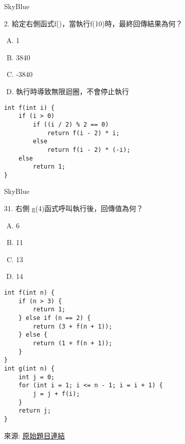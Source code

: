\documentclass{article}
\begin{document}
\renewcommand{\baselinestretch}{1.5}


\begin{sblock}{SkyBlue}

2. 給定右側函式f()，當執行f(10)時，最終回傳結果為何？\\

\begin{enumerate}[(A)]
    \item 1
    \item 3840
    \item -3840
    \item 執行時導致無限迴圈，不會停止執行
\end{enumerate}

\tcblower
\begin{verbatim}
int f(int i) {
	if (i > 0)
		if ((i / 2) % 2 == 0)
			return f(i - 2) * i;
		else
			return f(i - 2) * (-i);
	else
		return 1;
}
\end{verbatim}
\end{sblock}

\begin{sblock}{SkyBlue}

31. 右側 g(4)函式呼叫執行後，回傳值為何？\\

\begin{enumerate}[(A)]
    \item 6
    \item 11
    \item 13
    \item 14
\end{enumerate}

\tcblower

\begin{verbatim}
int f(int n) {
	if (n > 3) {
		return 1;
	} else if (n == 2) {
		return (3 + f(n + 1));
	} else {
		return (1 + f(n + 1));
	}
}
int g(int n) {
	int j = 0;
	for (int i = 1; i <= n - 1; i = i + 1) {
		j = j + f(i);
	}
	return j;
}
\end{verbatim}

\end{sblock}
來源:
\href{https://apcs.csie.ntnu.edu.tw/wp-content/uploads/2022/10/%E8%A7%80%E5%BF%B5%E9%A1%8C_%E9%A1%8C%E5%9E%8B%E7%AF%84%E4%BE%8B.pdf}{原始題目連結}
\end{document}
